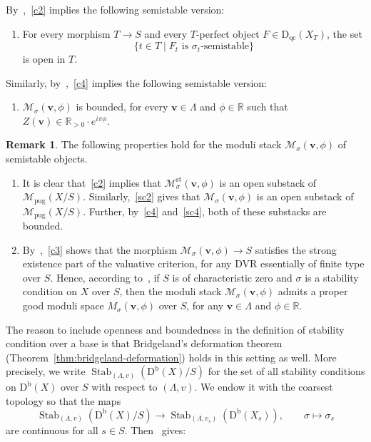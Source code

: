 \documentclass[11pt, reqno]{amsart}
\numberwithin{equation}{section}
\theoremstyle{plain}
\theoremstyle{remark}
\theoremstyle{definition}
\newtheorem{remark}[theorem]{Remark}
\theoremstyle{italicsname}
\newcommand{\st}{\mid}
\newcommand{\bv}{\mathbf{v}}
\newcommand{\Db}{\mathrm{D^b}}
\newcommand{\Dqc}{\mathrm{D}_{\mathrm{qc}}}
\DeclareMathOperator{\Stab}{Stab}
\newcommand{\cM}{\mathcal{M}}
\def\RR{\ensuremath{\mathbb{R}}}
\begin{document}
By~\cite[Proposition 20.8]{stability-families},~\ref{c2} implies the following semistable version:
\begin{enumerate}[label={\rm (ii')}]
    \item\label{sc2} For every morphism $T\to S$ and every $T$-perfect object $F\in \Dqc(X_T)$, the set 
    \[
    \{t\in T \st F_t \text{ is }\sigma_t\text{-semistable}\}
    \]
    is open in $T$.
\end{enumerate}
Similarly, by~\cite[Lemma~21.20]{stability-families},~\ref{c4} implies the following semistable version: 
\begin{enumerate}[label={\rm(iv')}]
    \item \label{sc4} 
    $\cM_{{\sigma}}(\bv,\phi)$ is bounded, for every $\bv\in \Lambda$ and $\phi\in \RR$ such that $Z(\bv)\in\RR_{>0}\cdot e^{i\pi\phi}$.
\end{enumerate}

\begin{remark}\label{rmk:FamilyStabilityConditions}
The following properties hold for the moduli stack $\cM_{{\sigma}}(\bv,\phi)$ of semistable objects.
\begin{enumerate}
\item\label{enum:FamilyStabilityConditions1} It is clear that~\ref{c2} implies that $\cM^{\mathrm{st}}_{{\sigma}}(\bv,\phi)$ is an open substack of $\cM_{\mathrm{pug}}(X/S)$. Similarly,~\ref{sc2} gives that $\cM_{{\sigma}}(\bv,\phi)$ is an open substack of $\cM_{\mathrm{pug}}(X/S)$. 
Further, by~\ref{c4} and~\ref{sc4}, both of these substacks are bounded.
\item\label{enum:FamilyStabilityConditions3} By~\cite[Lemma 21.22]{stability-families},~\ref{c3} shows that the morphism $\cM_{{\sigma}}(\bv,\phi)\to S$ satisfies the strong existence part of the valuative criterion, for any DVR essentially of finite type over $S$.
Hence, according to~\cite[Theorem 21.24]{stability-families}, if $S$ is of characteristic zero and ${\sigma}$ is a stability condition on $X$ over $S$, then the moduli stack $\cM_{{\sigma}}(\bv,\phi)$ admits a proper good moduli space $M_{{\sigma}}(\bv,\phi)$ over $S$, for any $\bv\in\Lambda$ and $\phi\in \RR$.   
\end{enumerate}
\end{remark}

The reason to include openness and boundedness in the definition of stability condition over a base is that Bridgeland's deformation theorem (Theorem~\ref{thm:bridgeland-deformation}) holds in this setting as well.
More precisely, we write $\Stab_{(\Lambda,v)}(\Db(X)/S)$ for the set of all stability conditions on $\Db(X)$ over $S$ with respect to $(\Lambda,v)$.
We endow it with the coarsest topology so that the maps 
\[
\Stab_{(\Lambda,v)}(\Db(X)/S)\longrightarrow\Stab_{(\Lambda,v_s)}(\Db(X_s)), \qquad {\sigma}\longmapsto\sigma_s
\]
are continuous for all $s\in S$.
Then~\cite[Theorem 22.2]{stability-families} gives:
\end{document}
